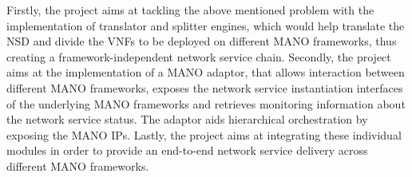 Firstly, the project aims at tackling the above mentioned problem with the implementation of translator and splitter engines, which would help translate the NSD and divide the VNFs to be deployed on different MANO frameworks, thus creating a framework-independent network service chain. Secondly, the project aims at the implementation of a MANO adaptor, that allows interaction between different MANO frameworks, exposes the network service instantiation interfaces of the underlying MANO frameworks and retrieves monitoring information about the network service status. The adaptor aids hierarchical orchestration by exposing the MANO IPs. Lastly, the project aims at integrating these individual modules in order to provide an end-to-end network service delivery across different MANO frameworks.


